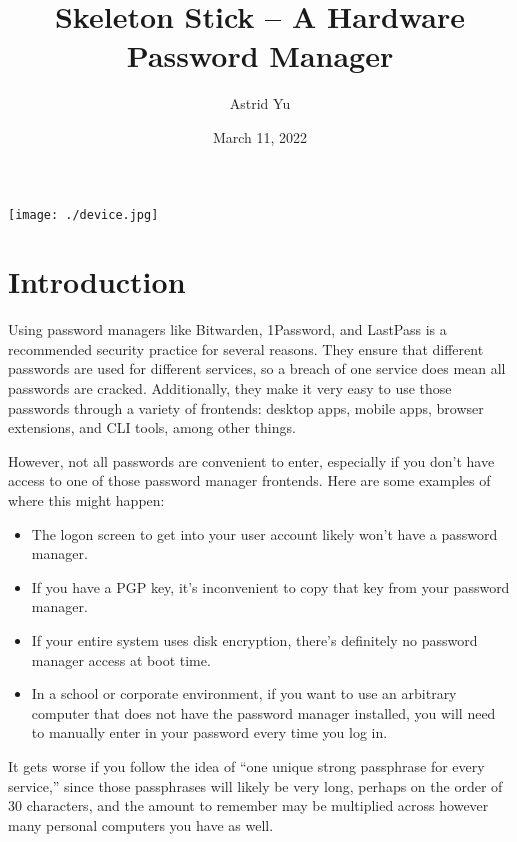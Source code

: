 \documentclass{article}
\title{Skeleton Stick -- A Hardware Password Manager}
\author{Astrid Yu}
\date{March 11, 2022}
\begin{document}
\maketitle

\begin{center}
    \texttt{[image: ./device.jpg]}
\end{center}

\pagebreak

\tableofcontents

\pagebreak

\section{Introduction}

Using password managers like Bitwarden, 1Password, and LastPass is a recommended security practice for several reasons. They ensure that different passwords are used for different services, so a breach of one service does mean all passwords are cracked. Additionally, they make it very easy to use those passwords through a variety of frontends: desktop apps, mobile apps, browser extensions, and CLI tools, among other things.

However, not all passwords are convenient to enter, especially if you don't have access to one of those password manager frontends. Here are some examples of where this might happen:

\begin{itemize}
    \item The logon screen to get into your user account likely won't have a password manager.
    \item If you have a PGP key, it's inconvenient to copy that key from your password manager.
    \item If your entire system uses disk encryption, there's definitely no password manager access at boot time.
    \item In a school or corporate environment, if you want to use an arbitrary computer that does not have the password manager installed, you will need to manually enter in your password every time you log in.
\end{itemize}

It gets worse if you follow the idea of ``one unique strong passphrase for every service,'' since those passphrases will likely be very long, perhaps on the order of 30 characters, and the amount to remember may be multiplied across however many personal computers you have as well.
\end{document}
